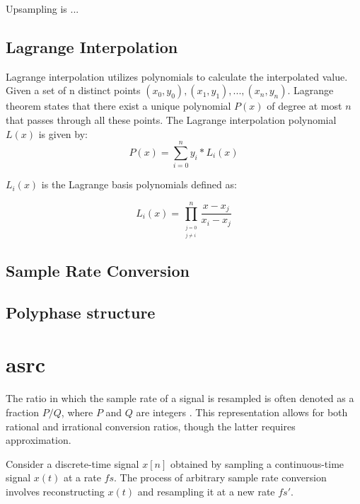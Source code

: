 
Upsampling is ...
\cite{harris_multirate_2022}

\subsection{Lagrange Interpolation}
Lagrange interpolation utilizes polynomials to calculate the interpolated value.  Given a set of n distinct points $(x_0, y_0), (x_1, y_1), ..., (x_n, y_n)$. Lagrange theorem states that there exist a unique polynomial $P(x)$ of degree at most $n$ that passes through all these points. The Lagrange interpolation polynomial $L(x)$ is given by:
\begin{equation}
    P(x) = \sum_{i=0}^{n} y_i * L_i(x)
\end{equation}

$L_i(x)$ is the Lagrange basis polynomials defined as:

\begin{equation}
    L_i(x) = \prod_{_{\substack{j=0 \\ j\neq i}}}^n \frac{x - x_j}{x_i - x_j}
\end{equation} 
\cite{kreyszig_advanced_2011}

\subsection{Sample Rate Conversion}


\subsection{Polyphase structure}

\section{\acrfull{asrc}}
The ratio in which the sample rate of a signal is resampled is often denoted as a fraction $P/Q$, where $P$ and $Q$ are integers \cite{harris_multirate_2022}
. This representation allows for both rational and irrational conversion ratios, though the latter requires approximation.

Consider a discrete-time signal $x[n]$ obtained by sampling a continuous-time signal $x(t)$ at a rate $fs$. The process of arbitrary sample rate conversion involves reconstructing $x(t)$ and resampling it at a new rate $fs'$.

